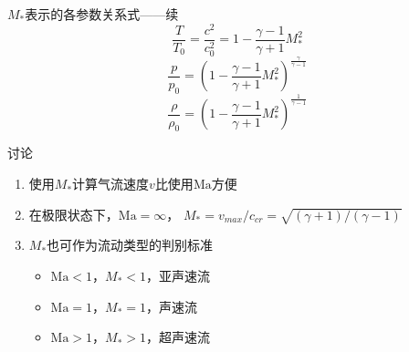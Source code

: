 \begin{frame}{$M_{*}$表示的各参数关系式——续}
  \vspace*{-1.5em}
 \begin{equation*}
   \frac{T}{T_{0}}
   =
   \frac{c^{2}}{c_{0}^{2}}
   =
   1
   -
   \frac{\gamma-1}{\gamma+1}M_{*}^{2}
 \end{equation*} 
 \begin{equation*}
   \frac{p}{p_{0}}
   =
   \left(1-\frac{\gamma-1}{\gamma+1}M_{*}^{2}\right)^{\frac{\gamma}{\gamma-1}}
 \end{equation*}
 \begin{equation*}
   \frac{\rho}{\rho_{0}}
   =
   \left(1-\frac{\gamma-1}{\gamma+1}M_{*}^{2}\right)^{\frac{1}{\gamma-1}}
 \end{equation*}
  \vspace*{-1.5em}
 \begin{block}{讨论}
   \begin{enumerate}
     \item 使用$M_{*}$计算气流速度$v$比使用$\mathrm{Ma}$方便
     \item 在极限状态下，$\mathrm{Ma}=\infty$，
     $M_{*}=v_{max}/c_{cr}=\sqrt{(\gamma+1)/(\gamma-1)}$
     \item $M_{*}$也可作为流动类型的判别标准
       \begin{itemize}
         \item $\mathrm{Ma}<1$，$M_{*}<1$，亚声速流
         \item $\mathrm{Ma}=1$，$M_{*}=1$，声速流
         \item $\mathrm{Ma}>1$，$M_{*}>1$，超声速流
       \end{itemize}
   \end{enumerate}
 \end{block}
\end{frame}

